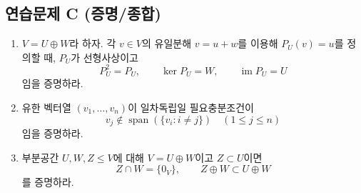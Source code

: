 \subsection*{연습문제 C (증명/종합)}
\begin{enumerate}[label=C\arabic*.]
\item $V=U\oplus W$라 하자. 각 $v\in V$의 유일분해 $v=u+w$를 이용해 $P_U(v)=u$를 정의할 때, $P_U$가 선형사상이고
\[
P_U^2=P_U,\qquad \ker P_U=W,\qquad \operatorname{im}P_U=U
\]
임을 증명하라.
\item 유한 벡터열 $(v_1,\dots,v_n)$이 일차독립일 필요충분조건이
\[
v_j\notin\operatorname{span}(\{v_i:i\neq j\})\quad(1\le j\le n)
\]
임을 증명하라.
\item 부분공간 $U,W,Z\le V$에 대해 $V=U\oplus W$이고 $Z\subset U$이면
\[
Z\cap W=\{0_V\},\qquad Z\oplus W\subset U\oplus W
\]
를 증명하라.
\end{enumerate}